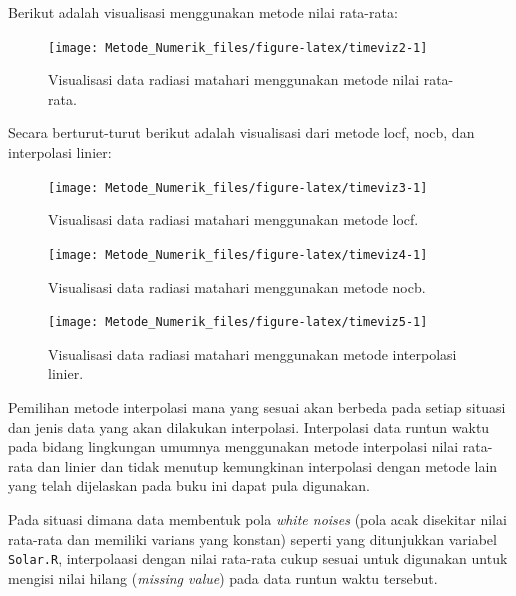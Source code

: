 \documentclass[]{book}
\theoremstyle{definition}
\theoremstyle{definition}
\theoremstyle{definition}
\theoremstyle{remark}
\begin{document}
Berikut adalah visualisasi menggunakan metode nilai rata-rata:

\begin{figure}

{\centering \texttt{[image: Metode\_Numerik\_files/figure-latex/timeviz2-1]} 

}

\caption{Visualisasi data radiasi matahari menggunakan metode nilai rata-rata.}\label{fig:timeviz2}
\end{figure}

Secara berturut-turut berikut adalah visualisasi dari metode locf, nocb, dan interpolasi linier:

\begin{figure}

{\centering \texttt{[image: Metode\_Numerik\_files/figure-latex/timeviz3-1]} 

}

\caption{Visualisasi data radiasi matahari menggunakan metode locf.}\label{fig:timeviz3}
\end{figure}

\begin{figure}

{\centering \texttt{[image: Metode\_Numerik\_files/figure-latex/timeviz4-1]} 

}

\caption{Visualisasi data radiasi matahari menggunakan metode nocb.}\label{fig:timeviz4}
\end{figure}

\begin{figure}

{\centering \texttt{[image: Metode\_Numerik\_files/figure-latex/timeviz5-1]} 

}

\caption{Visualisasi data radiasi matahari menggunakan metode interpolasi linier.}\label{fig:timeviz5}
\end{figure}

Pemilihan metode interpolasi mana yang sesuai akan berbeda pada setiap situasi dan jenis data yang akan dilakukan interpolasi. Interpolasi data runtun waktu pada bidang lingkungan umumnya menggunakan metode interpolasi nilai rata-rata dan linier dan tidak menutup kemungkinan interpolasi dengan metode lain yang telah dijelaskan pada buku ini dapat pula digunakan.

Pada situasi dimana data membentuk pola \emph{white noises} (pola acak disekitar nilai rata-rata dan memiliki varians yang konstan) seperti yang ditunjukkan variabel \texttt{Solar.R}, interpolaasi dengan nilai rata-rata cukup sesuai untuk digunakan untuk mengisi nilai hilang (\emph{missing value}) pada data runtun waktu tersebut.
\end{document}
